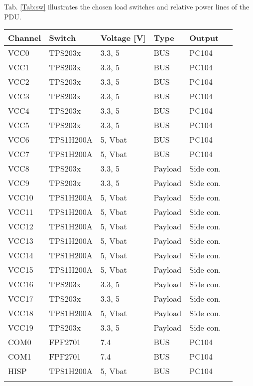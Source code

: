Tab. \ref{Tab:sw} illustrates the chosen load switches and relative power lines of the PDU.
\begin{tabular}{p{2cm}p{2cm}p{2cm}p{2cm}p{2cm}p{2cm}} \toprule
	Channel & Switch  & Voltage [V] & Type & Output\\ \midrule
	VCC0 & TPS203x & 3.3, 5 & BUS & PC104\\
	VCC1 & TPS203x & 3.3, 5 & BUS & PC104\\
	VCC2 & TPS203x & 3.3, 5 & BUS & PC104\\
	VCC3 & TPS203x & 3.3, 5 & BUS & PC104\\
	VCC4 & TPS203x & 3.3, 5 & BUS & PC104\\
    VCC5 & TPS203x & 3.3, 5 & BUS & PC104\\
    VCC6 & TPS1H200A & 5, Vbat & BUS & PC104\\
    VCC7 & TPS1H200A & 5, Vbat & BUS & PC104\\
    VCC8 & TPS203x & 3.3, 5 & Payload & Side con.\\
    VCC9 & TPS203x & 3.3, 5 & Payload & Side con.\\
    VCC10 & TPS1H200A & 5, Vbat & Payload & Side con.\\
    VCC11 & TPS1H200A & 5, Vbat & Payload & Side con.\\
    VCC12 & TPS1H200A & 5, Vbat & Payload & Side con.\\
    VCC13 & TPS1H200A & 5, Vbat & Payload & Side con.\\
    VCC14 & TPS1H200A & 5, Vbat & Payload & Side con.\\
    VCC15 & TPS1H200A & 5, Vbat & Payload & Side con.\\
    VCC16 & TPS203x & 3.3, 5 & Payload & Side con.\\
    VCC17 & TPS203x & 3.3, 5 & Payload & Side con.\\
    VCC18 & TPS1H200A & 5, Vbat & Payload & Side con.\\
    VCC19 & TPS203x & 3.3, 5 & Payload & Side con.\\
    COM0 & FPF2701 & 7.4 & BUS & PC104\\
    COM1 & FPF2701 & 7.4 & BUS & PC104\\
    HISP & TPS1H200A & 5, Vbat & BUS & PC104\\ \\
	\bottomrule
	
\end{tabular}\\ \\ \\ \\
\label{Tab:sw}

